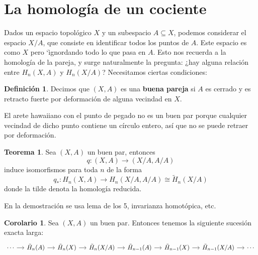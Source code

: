 \documentclass[spanish]{book}
\theoremstyle{definition}
\newtheorem*{defn}{Definición}
\newtheorem*{teo}{Teorema}
\newtheorem*{coro}{Corolario}
\begin{document}
\section{La homología de un cociente}
	Dados un espacio topológico $X$ y un subespacio $A\subseteq X$, podemos considerar el espacio $X/A$, que consiste en identificar todos los puntos de $A$. Este espacio es como $X$ pero `ìgnordando todo lo que pasa en $A$. Esto nos recuerda a la homología de la pareja, y surge naturalmente la pregunta: ¿hay alguna relación entre $H_n(X,A)$ y $H_n(X/A)$? Necesitamos ciertas condiciones:
	
	\begin{defn} Decimos que $(X,A)$ es una \textbf{buena pareja} si $A$ es cerrado y es retracto fuerte por deformación de alguna vecindad en $X$.
	\end{defn}
	
	El arete hawaiiano con el punto de pegado no es un buen par porque cualquier vecindad de dicho punto contiene un círculo entero, así que no se puede retraer por deformación.
	
	\begin{teo}Sea $(X,A)$ un buen par, entonces
		\[q:(X,A)\to(X/A,A/A)\]
		induce isomorfismos para toda $n$ de la forma
		\[q_{*}:H_n(X,A)\to H_n(X/A,A/A)\cong \tilde{H}_n(X/A)\]
		donde la tilde denota la homología reducida.
	\end{teo}
	
	En la demostración se usa lema de los 5, invarianza homotópica, etc.
	
	\begin{coro}
		Sea $(X,A)$ un buen par. Entonces tenemos la siguiente sucesión exacta larga:
		\[\begin{tikzcd}[column sep=small]
			\cdots \arrow[r] & \tilde{H}_n(A) \arrow[r] & \tilde{H}_n(X) \arrow[r] & \tilde{H}_n(X/A) \arrow[r] & \tilde{H}_{n-1}(A) \arrow[r] & \tilde{H}_{n-1}(X) \arrow[r] & \tilde{H}_{n-1}(X/A) \arrow[r] & \cdots
		\end{tikzcd}\]
	\end{coro}
	
\end{document}

